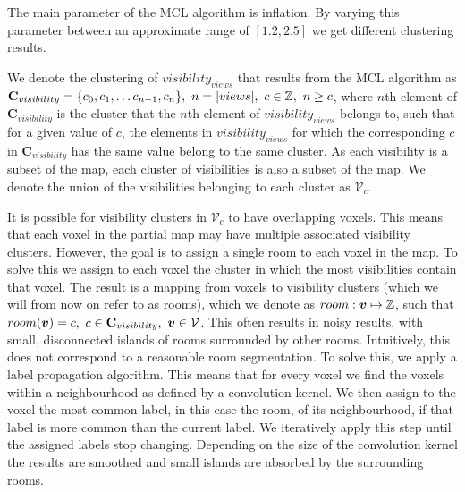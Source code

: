 The main parameter of the MCL algorithm is inflation. By varying this parameter between an approximate range of \([1.2, 2.5]\) we get different clustering results. 

We denote the clustering of \(visibility_{views}\) that results from the MCL algorithm as \(\mathbf{C}_{visibility} = \{c_0, c_1, \dots c_{n-1}, c_{n}\},\ n=|views|,\ c \in \mathbb{Z},\ n \geq c\), where \(n\)th element of \(\mathbf{C}_{visibility}\) is the cluster that the \(n\)th element of \(visibility_{views}\) belongs to, such that for a given value of \(c\), the elements in \(visibility_{views}\) for which the corresponding \(c\) in \(\mathbf{C}_{visibility}\) has the same value belong to the same cluster. As each visibility is a subset of the map, each cluster of visibilities is also a subset of the map. We denote the union of the visibilities belonging to each cluster as \(\mathcal{V}_{c}\). 

It is possible for visibility clusters in \(\mathcal{V}_{c}\) to have overlapping voxels. This means that each voxel in the partial map may have multiple associated visibility clusters. However, the goal is to assign a single room to each voxel in the map. To solve this we assign to each voxel the cluster in which the most visibilities contain that voxel. The result is a mapping from voxels to visibility clusters (which we will from now on refer to as rooms), which we denote as \(room: \boldsymbol{v} \mapsto \mathbb{Z}\), such that \(room(\boldsymbol{v}) = c,\ c \in \mathbf{C}_{visibility},\ \boldsymbol{v} \in \mathcal{V}\). This often results in noisy results, with small, disconnected islands of rooms surrounded by other rooms. Intuitively, this does not correspond to a reasonable room segmentation. To solve this, we apply a label propagation algorithm. This means that for every voxel we find the voxels within a neighbourhood as defined by a convolution kernel. We then assign to the voxel the most common label, in this case the room, of its neighbourhood, if that label is more common than the current label. We iteratively apply this step until the assigned labels stop changing. Depending on the size of the convolution kernel the results are smoothed and small islands are absorbed by the surrounding rooms.

